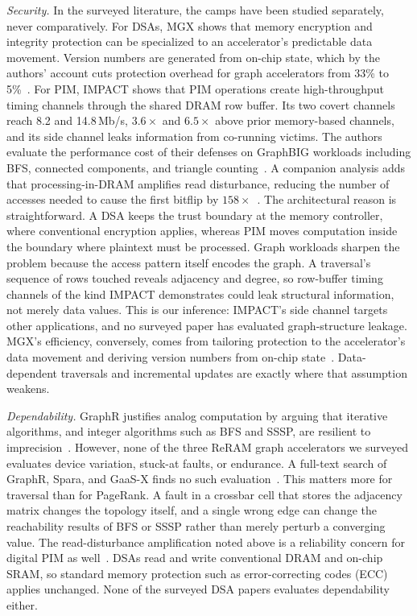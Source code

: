 \documentclass[journal,onecolumn]{IEEEtran}
\begin{document}
\emph{Security.} In the surveyed literature, the camps have been studied separately, never comparatively. For DSAs, MGX shows that memory encryption and integrity protection can be specialized to an accelerator's predictable data movement. Version numbers are generated from on-chip state, which by the authors' account cuts protection overhead for graph accelerators from 33\% to 5\%~\cite{hua2022mgx}. For PIM, IMPACT shows that PIM operations create high-throughput timing channels through the shared DRAM row buffer. Its two covert channels reach 8.2 and 14.8\,Mb/s, $3.6\times$ and $6.5\times$ above prior memory-based channels, and its side channel leaks information from co-running victims. The authors evaluate the performance cost of their defenses on GraphBIG workloads including BFS, connected components, and triangle counting~\cite{bostanci2025impact}. A companion analysis adds that processing-in-DRAM amplifies read disturbance, reducing the number of accesses needed to cause the first bitflip by $158\times$~\cite{yuksel2026pid}. The architectural reason is straightforward. A DSA keeps the trust boundary at the memory controller, where conventional encryption applies, whereas PIM moves computation inside the boundary where plaintext must be processed. Graph workloads sharpen the problem because the access pattern itself encodes the graph. A traversal's sequence of rows touched reveals adjacency and degree, so row-buffer timing channels of the kind IMPACT demonstrates could leak structural information, not merely data values. This is our inference: IMPACT's side channel targets other applications, and no surveyed paper has evaluated graph-structure leakage. MGX's efficiency, conversely, comes from tailoring protection to the accelerator's data movement and deriving version numbers from on-chip state~\cite{hua2022mgx}. Data-dependent traversals and incremental updates are exactly where that assumption weakens.

\emph{Dependability.} GraphR justifies analog computation by arguing that iterative algorithms, and integer algorithms such as BFS and SSSP, are resilient to imprecision~\cite{song2018graphr}. However, none of the three ReRAM graph accelerators we surveyed evaluates device variation, stuck-at faults, or endurance. A full-text search of GraphR, Spara, and GaaS-X finds no such evaluation~\cite{song2018graphr,zheng2020spara,challapalle2020gaasx}. This matters more for traversal than for PageRank. A fault in a crossbar cell that stores the adjacency matrix changes the topology itself, and a single wrong edge can change the reachability results of BFS or SSSP rather than merely perturb a converging value. The read-disturbance amplification noted above is a reliability concern for digital PIM as well~\cite{yuksel2026pid}. DSAs read and write conventional DRAM and on-chip SRAM, so standard memory protection such as error-correcting codes (ECC) applies unchanged. None of the surveyed DSA papers evaluates dependability either.
\end{document}
